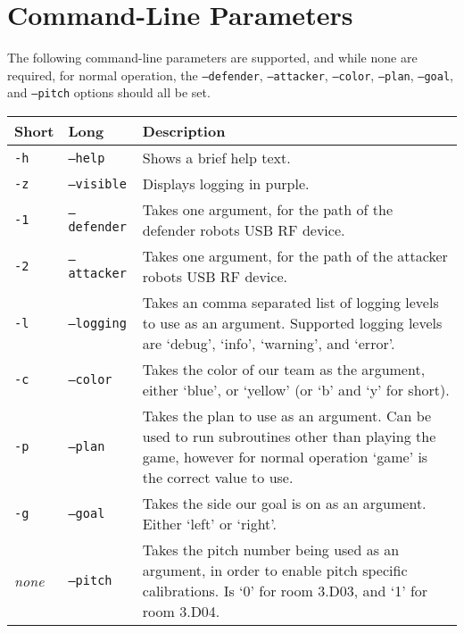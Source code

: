 \section{Command-Line Parameters} \label{params}

The following command-line parameters are supported, and while none are
required, for normal operation, the \texttt{--defender}, \texttt{--attacker},
\texttt{--color}, \texttt{--plan}, \texttt{--goal}, and \texttt{--pitch}
options should all be set.

\vspace{5mm}

\begin{tabularx}{\textwidth}{ll|X}
    Short       & Long & Description \\
    \hline
    \texttt{-h} & \texttt{--help}     & Shows a brief help text. \\
    \texttt{-z} & \texttt{--visible}  & Displays logging in purple. \\
    \texttt{-1} & \texttt{--defender} & Takes one argument, for the path of the
    defender robots USB RF device. \\
    \texttt{-2} & \texttt{--attacker} & Takes one argument, for the path of the
    attacker robots USB RF device. \\
    \texttt{-l} & \texttt{--logging}  & Takes an comma separated list of
    logging levels to use as an argument. Supported logging levels are `debug',
    `info', `warning', and `error'. \\
    \texttt{-c} & \texttt{--color}    & Takes the color of our team as the
    argument, either `blue', or `yellow' (or `b' and `y' for short). \\
    \texttt{-p} & \texttt{--plan}     & Takes the plan to use as an argument.
    Can be used to run subroutines other than playing the game, however for
    normal operation `game' is the correct value to use. \\
    \texttt{-g} & \texttt{--goal}     & Takes the side our goal is on as an
    argument. Either `left' or `right'. \\
    \textit{none} & \texttt{--pitch}  & Takes the pitch number being used as an
    argument, in order to enable pitch specific calibrations. Is `0' for room
    3.D03, and `1' for room 3.D04. \\
\end{tabularx}
